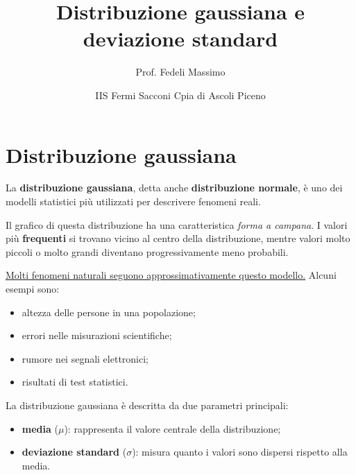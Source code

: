 \documentclass[12pt, a4paper]{article}
\title{%
  \textcolor{gaussblue}{\textbf{Distribuzione gaussiana e deviazione standard}}
}
\author{Prof. Fedeli Massimo}
\date{IIS Fermi Sacconi Cpia di Ascoli Piceno}
\begin{document}
\maketitle
\thispagestyle{empty}

\section{Distribuzione gaussiana}

La \textbf{distribuzione gaussiana}, detta anche \textbf{distribuzione normale}, è uno dei modelli statistici più utilizzati per descrivere fenomeni reali. 

Il grafico di questa distribuzione ha una caratteristica \emph{forma a campana}. I valori più \textbf{frequenti} si trovano vicino al centro della distribuzione, mentre valori molto piccoli o molto grandi diventano progressivamente meno probabili.

\begin{center}
\end{center}

\underline{Molti fenomeni naturali seguono approssimativamente questo modello.} Alcuni esempi sono:

\begin{itemize}
  \item altezza delle persone in una popolazione;
  \item errori nelle misurazioni scientifiche;
  \item rumore nei segnali elettronici;
  \item risultati di test statistici.
\end{itemize}

La distribuzione gaussiana è descritta da due parametri principali:

\begin{itemize}
  \item \textbf{media} ($\mu$): rappresenta il valore centrale della distribuzione;
  \item \textbf{deviazione standard} ($\sigma$): misura quanto i valori sono dispersi rispetto alla media.
\end{itemize}
\end{document}
